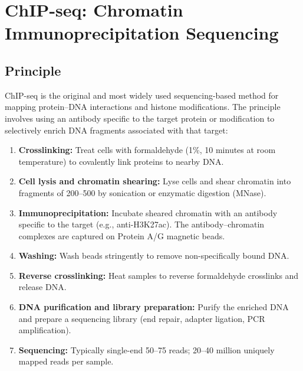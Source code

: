 \section{ChIP-seq: Chromatin Immunoprecipitation Sequencing}
\label{sec:histones:chipseq}

\subsection{Principle}
\label{subsec:histones:chipseq-principle}

\acrfull{ChIP-seq} is the original and most widely used sequencing-based method for mapping protein--DNA interactions and histone modifications. The principle involves using an antibody specific to the target protein or modification to selectively enrich DNA fragments associated with that target:

\begin{enumerate}[itemsep=2pt]
  \item \textbf{Crosslinking:} Treat cells with formaldehyde (1\%, 10 minutes at room temperature) to covalently link proteins to nearby DNA.
  \item \textbf{Cell lysis and chromatin shearing:} Lyse cells and shear chromatin into fragments of 200--500\basepair{} by sonication or enzymatic digestion (MNase).
  \item \textbf{Immunoprecipitation:} Incubate sheared chromatin with an antibody specific to the target (e.g., anti-H3K27ac). The antibody--chromatin complexes are captured on Protein A/G magnetic beads.
  \item \textbf{Washing:} Wash beads stringently to remove non-specifically bound DNA.
  \item \textbf{Reverse crosslinking:} Heat samples to reverse formaldehyde crosslinks and release DNA.
  \item \textbf{DNA purification and library preparation:} Purify the enriched DNA and prepare a sequencing library (end repair, adapter ligation, PCR amplification).
  \item \textbf{Sequencing:} Typically single-end 50--75\basepair{} reads; 20--40 million uniquely mapped reads per sample.
\end{enumerate}

